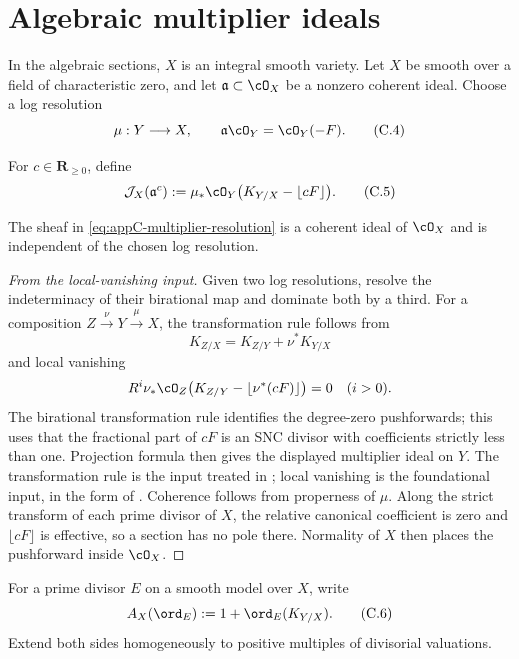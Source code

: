 \section{Algebraic multiplier ideals}
\label{sec:appC-algebraic-multiplier}

In the algebraic sections, \(X\) is an integral smooth variety.
Let \(X\) be smooth over a field of characteristic zero, and let
\(\mathfrak a\subset\cO_X\) be a nonzero coherent ideal.
Choose a log resolution
\[
 \mu:Y\longrightarrow X,\qquad
 \mathfrak a\cO_Y=\cO_Y(-F).
\tag{C.4}\label{eq:appC-log-resolution}
\]

\begin{definition}
\label{def:appC-algebraic-multiplier}
For \(c\in\mathbf R_{\geq0}\), define
\[
 \mathcal J_X(\mathfrak a^c)
 :=\mu_*\cO_Y\bigl(K_{Y/X}-\lfloor cF\rfloor\bigr).
\tag{C.5}\label{eq:appC-multiplier-resolution}
\]
\end{definition}

\begin{theorem}\label{thm:appC-independent-resolution}
The sheaf in \eqref{eq:appC-multiplier-resolution} is a coherent ideal of
\(\cO_X\) and is independent of the chosen log resolution.
\end{theorem}

\begin{proof}[From the local-vanishing input]
Given two log resolutions, resolve the indeterminacy of their birational
map and dominate both by a third.  For a composition
\(Z\xrightarrow{\nu}Y\xrightarrow{\mu}X\), the transformation rule follows
from
\[
 K_{Z/X}=K_{Z/Y}+\nu^*K_{Y/X}
\]
and local vanishing
\[
 R^i\nu_*\cO_Z
  \bigl(K_{Z/Y}-\lfloor\nu^*(cF)\rfloor\bigr)=0
 \quad(i>0).
\]
The birational transformation rule identifies the degree-zero
pushforwards; this uses that the fractional part of \(cF\) is an SNC
divisor with coefficients strictly less than one.  Projection formula
then gives the displayed multiplier ideal on \(Y\).  The transformation
rule is the input treated in \cite[Section~9.2]{PAG2}; local vanishing is
the foundational input, in the form of
\cite[Theorem~9.4.1]{PAG2}.  Coherence follows from
properness of \(\mu\).  Along the strict transform of each prime
divisor of \(X\), the relative canonical coefficient is zero and
\(\lfloor cF\rfloor\) is effective, so a section has no pole there.
Normality of \(X\) then places the pushforward inside \(\cO_X\).
\end{proof}

For a prime divisor \(E\) on a smooth model over \(X\), write
\[
 A_X(\ord_E):=1+\ord_E(K_{Y/X}).
\tag{C.6}\label{eq:appC-log-discrepancy}
\]
Extend both sides homogeneously to positive multiples of divisorial
valuations.

